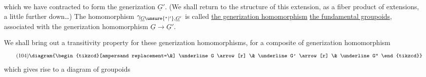 which we have contracted to form the generization $\underline G'$.  (We shall return to the structure of this extension, as a fiber product of extensions, a little further down\ldots) The homomorphism $\gamma_{\underline G\unsure{{}^*|{}'},\underline G'}$ is called \uline{the generization homomorphism}  \uline{the fundamental groupoids}, associated with the generization homomorphism $\underline G\to\underline G'$.

We shall bring out a transitivity property for these generization homomorphisms, for a composite of generization homomorphism
\[
\tag{104}
\diagram{\begin{tikzcd}[ampersand replacement=\&]
\underline G \arrow[r] \& \underline G' \arrow[r] \& \underline G''
\end{tikzcd}}
\]
which gives rise to a diagram of groupoids
